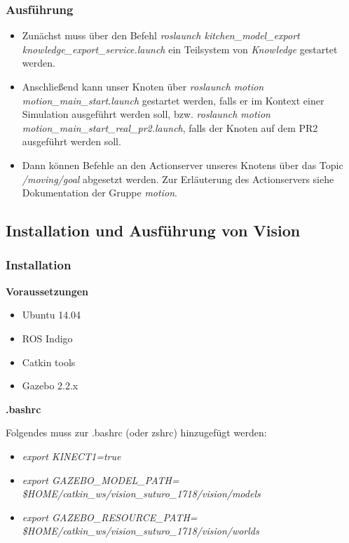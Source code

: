 \documentclass{suturo}
\begin{document}
\subsubsection{Ausführung}
\begin{itemize}

\item Zunächst muss über den Befehl \textit{roslaunch kitchen\_model\_export knowledge\_export\_service.launch} ein Teilsystem von \textit{Knowledge} gestartet werden.

\item Anschließend kann unser Knoten über \textit{roslaunch motion motion\_main\_start.launch} gestartet werden, falls er im Kontext einer Simulation ausgeführt werden soll, bzw. \textit{roslaunch motion motion\_main\_start\_real\_pr2.launch}, falls der Knoten auf dem PR2 ausgeführt werden soll.

\item Dann können Befehle an den Actionserver unseres Knotens über das Topic \textit{/moving/goal} abgesetzt werden. Zur Erläuterung des Actionservers siehe Dokumentation der Gruppe \textit{motion}.
\end{itemize}


\subsection{Installation und Ausführung von Vision}

\subsubsection{Installation}

\textbf{Voraussetzungen}

\begin{itemize}
\item Ubuntu 14.04
\item ROS Indigo
\item Catkin tools
\item Gazebo 2.2.x
\end{itemize}

\textbf{.bashrc}

Folgendes muss zur .bashrc (oder zshrc) hinzugefügt werden:
\begin{itemize}
\item \textit{export KINECT1=true}
\item \textit{export GAZEBO\_MODEL\_PATH= \$HOME/catkin\_ws/vision\_suturo\_1718/vision/models}
\item \textit{export GAZEBO\_RESOURCE\_PATH= \$HOME/catkin\_ws/vision\_suturo\_1718/vision/worlds}
\end{itemize}
\end{document}
